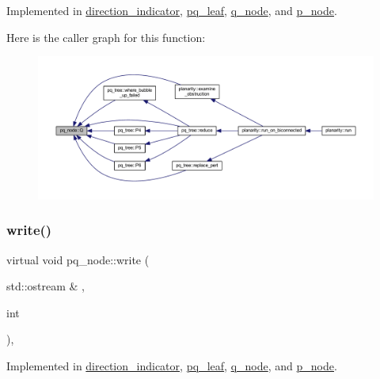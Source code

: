 Implemented in \mbox{\hyperlink{classdirection__indicator_ace3187cd86da88e949045c6a57ea6a00}{direction\+\_\+indicator}}, \mbox{\hyperlink{classpq__leaf_aa5816a18a112ab2e26cd971f4ab4aa8f}{pq\+\_\+leaf}}, \mbox{\hyperlink{classq__node_a9252fff1e71e91e318268bdb50b9056f}{q\+\_\+node}}, and \mbox{\hyperlink{classp__node_a93d94db17c833adaaf66bacbc8f55cec}{p\+\_\+node}}.

Here is the caller graph for this function\+:\nopagebreak
\begin{figure}[H]
\begin{center}
\leavevmode
\includegraphics[width=350pt]{classpq__node_aeeefcfcd19dbe4ca94e190006e8dd484_icgraph}
\end{center}
\end{figure}
\mbox{\label{classpq__node_aab7bddb053b6b25b90be00cba7de97f9}} 
\subsubsection{\texorpdfstring{write()}{write()}}
{\footnotesize\ttfamily virtual void pq\+\_\+node\+::write (\begin{DoxyParamCaption}\item[{std\+::ostream \&}]{,  }\item[{int}]{ }\end{DoxyParamCaption})\hspace{0.3cm}{\ttfamily [protected]}, {}}



Implemented in \mbox{\hyperlink{classdirection__indicator_a9da5371a5ca8678a10069400cc4ca580}{direction\+\_\+indicator}}, \mbox{\hyperlink{classpq__leaf_a5072c4b54cb0ee3f906e1f44ec03cd79}{pq\+\_\+leaf}}, \mbox{\hyperlink{classq__node_af2b3c8d32ad554d37c7c357cd34cdd92}{q\+\_\+node}}, and \mbox{\hyperlink{classp__node_a746285e60e6a8ab147ad11df78cdb8ea}{p\+\_\+node}}.

